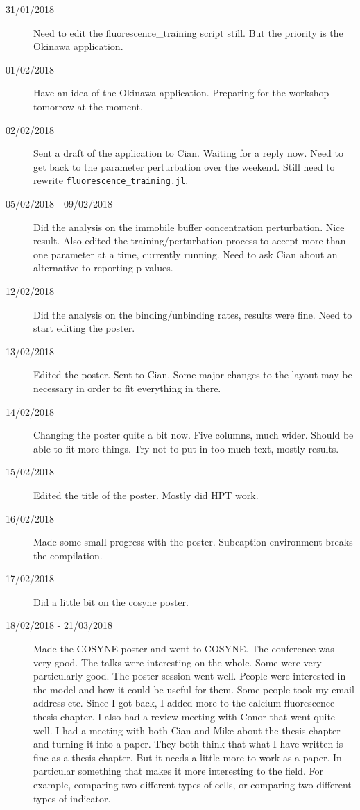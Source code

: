 \documentclass[a4paper,12pt]{article}
\theoremstyle{definition}
\begin{document}
\begin{description}
	\item[31/01/2018] Need to edit the fluorescence\_training script still. But the priority is the Okinawa application.

	\item[01/02/2018] Have an idea of the Okinawa application. Preparing for the workshop tomorrow at the moment.

	\item[02/02/2018] Sent a draft of the application to Cian. Waiting for a reply now. Need to get back to the parameter perturbation over the weekend. Still need to rewrite \texttt{fluorescence\_training.jl}.

	\item[05/02/2018 - 09/02/2018] Did the analysis on the immobile buffer concentration perturbation. Nice result. Also edited the training/perturbation process to accept more than one parameter at a time, currently running. Need to ask Cian about an alternative to reporting p-values.

	\item[12/02/2018] Did the analysis on the binding/unbinding rates, results were fine. Need to start editing the poster.

	\item[13/02/2018] Edited the poster. Sent to Cian. Some major changes to the layout may be necessary in order to fit everything in there.

	\item[14/02/2018] Changing the poster quite a bit now. Five columns, much wider. Should be able to fit more things. Try not to put in too much text, mostly results.

	\item[15/02/2018] Edited the title of the poster. Mostly did HPT work.

	\item[16/02/2018] Made some small progress with the poster. Subcaption environment breaks the compilation.

	\item[17/02/2018] Did a little bit on the cosyne poster.

        \item[18/02/2018 - 21/03/2018] Made the COSYNE poster and went to COSYNE. The conference was very good. The talks were interesting on the whole. Some were very particularly good. The poster session went well. People were interested in the model and how it could be useful for them. Some people took my email address etc. Since I got back, I added more to the calcium fluorescence thesis chapter. I also had a review meeting with Conor that went quite well. I had a meeting with both Cian and Mike about the thesis chapter and turning it into a paper. They both think that what I have written is fine as a thesis chapter. But it needs a little more to work as a paper. In particular something that makes it more interesting to the field. For example, comparing two different types of cells, or comparing two different types of indicator.


\end{description}
\end{document}
